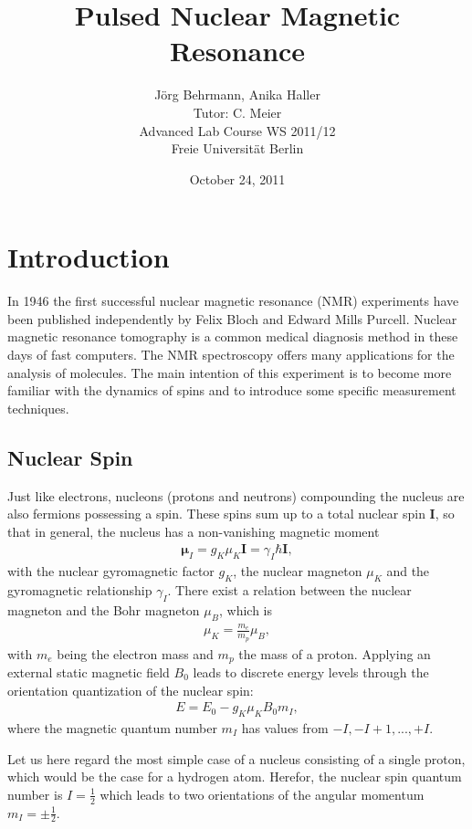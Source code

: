 \documentclass[a4paper,10pt]{article}
\title{Pulsed Nuclear Magnetic Resonance}
\author{J\"org Behrmann, Anika Haller\\ Tutor: C. Meier\\ Advanced Lab Course WS 2011/12 \\Freie Universit\"at Berlin}
\date{October 24, 2011}
\begin{document}
\maketitle

\section{Introduction}
In 1946 the first successful nuclear magnetic resonance (NMR) experiments have been published independently by Felix Bloch and Edward Mills Purcell.
Nuclear magnetic resonance tomography is a common medical diagnosis method in these days of fast computers. The NMR spectroscopy offers many applications for the analysis of molecules. 
The main intention of this experiment is to become more familiar with the dynamics of spins and to introduce some specific measurement techniques.

\subsection{Nuclear Spin}
Just like electrons, nucleons (protons and neutrons) compounding the nucleus are also fermions possessing a spin. These spins sum up to a total nuclear spin $\mathbf{I}$, so that in general, the nucleus has a non-vanishing magnetic moment
\begin{eqnarray}
 \mathbf{\mu}_I = g_K\mu_K \mathbf{I} = \gamma_I \hbar \mathbf{I}, 
\end{eqnarray}
with the nuclear gyromagnetic factor $g_K$, the nuclear magneton $\mu_K$ and the gyromagnetic relationship $\gamma_I$. There exist a relation between the nuclear magneton and the Bohr magneton $\mu_B$, which is
\begin{eqnarray}
 \mu_K = \frac{m_e}{m_p}\mu_B,
\end{eqnarray}
with $m_e$ being the electron mass and $m_p$ the mass of a proton.
Applying an external static magnetic field $B_0$ leads to discrete energy levels through the orientation quantization of the nuclear spin:
\begin{eqnarray}
 E=E_0 - g_K\mu_KB_0m_I,
\end{eqnarray}
where the magnetic quantum number $m_I$ has values from $-I,-I+1,...,+I$.

Let us here regard the most simple case of a nucleus consisting of a single proton, which would be the case for a hydrogen atom. Herefor, the nuclear spin quantum number is $I=\frac{1}{2}$ which leads to two orientations of the angular momentum $m_I = \pm\frac{1}{2}$.
\end{document}
